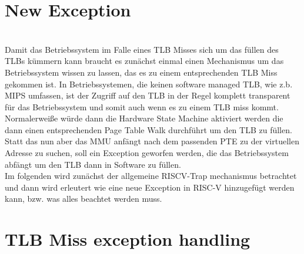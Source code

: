\section{New Exception}
\\
Damit das Betriebssystem im Falle eines TLB Misses sich um das füllen des TLBs kümmern kann
braucht es zunächst einmal einen Mechanismus um das Betriebssystem wissen zu lassen,
das es zu einem entsprechenden TLB Miss gekommen ist. In Betriebssystemen, die keinen
software managed TLB, wie z.b. MIPS \cite{MIPSArchitectureProgrammers2016} umfassen, ist der
Zugriff auf den TLB in der Regel komplett transparent für das Betriebssystem und somit auch wenn
es zu einem TLB miss kommt. Normalerweiße würde dann die Hardware State Machine aktiviert werden
die dann einen entsprechenden Page Table Walk durchführt um den TLB zu füllen.
\\
Statt das nun aber das MMU anfängt nach dem passenden PTE zu der virtuellen Adresse zu suchen,
soll ein Exception geworfen werden, die das Betriebssystem abfängt um den TLB dann in Software
zu füllen.\\
Im folgenden wird zunächst der allgemeine RISCV-Trap mechanismus betrachtet und dann
wird erleutert wie eine neue Exception in RISC-V hinzugefügt werden kann, bzw. was alles beachtet
werden muss.


\section{TLB Miss exception handling}
